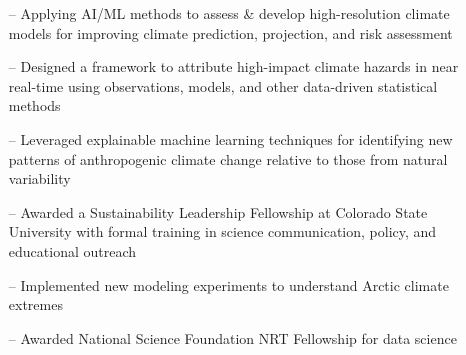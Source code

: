 \documentclass[10pt,letterpaper]{altacv} %
\begin{document}
\vspace*{-0.2cm}

\begin{itemize}
    \setlength{\itemindent}{0.5em}
    \item[--]   \small{Applying AI\slash ML methods to assess \& develop high-resolution climate models for improving climate prediction, projection, and risk assessment}
\end{itemize}
\medskip


\begin{itemize}
    \setlength{\itemindent}{0.5em}
    \item[--]   \small{Designed a framework to attribute high-impact climate hazards in near real-time using observations, models, and other data-driven statistical methods}
\end{itemize}
\medskip

\begin{itemize}
    \setlength{\itemindent}{0.5em}
    \item[--]   \small{Leveraged explainable machine learning techniques for identifying new patterns of anthropogenic climate change relative to those from natural variability}
    \item[--]    \small{Awarded a Sustainability Leadership Fellowship at Colorado State University with formal training in science communication, policy, and educational outreach}
\end{itemize}
\medskip

\begin{itemize}
    \setlength{\itemindent}{0.5em}
    \item[--]   \small{Implemented new modeling experiments to understand Arctic climate extremes}
    \item[--]    \small{Awarded National Science Foundation NRT Fellowship for data science}
\end{itemize}
\end{document}
